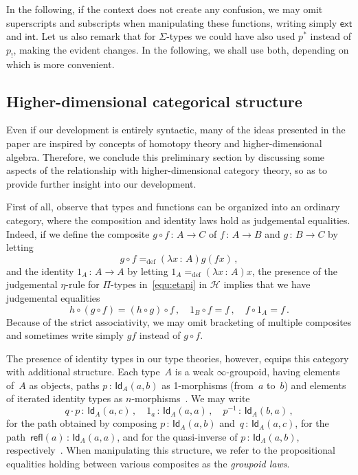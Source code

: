 \documentclass[10pt,a4paper,oneside,reqno]{amsart}
\numberwithin{equation}{section}
\theoremstyle{mythm}
\theoremstyle{mydef}
\theoremstyle{myrmk}
\newcommand{\defeq}{=_{\mathrm{def}}}
\newcommand{\co}{\,{:}\,}
\newcommand{\ct}{\cdot}
\newcommand{\Hint}{\mathcal{H}}
\newcommand{\ext}{\mathsf{ext}}
\renewcommand{\int}{\mathsf{int}}
\newcommand{\Id}{\mathsf{Id}}
\newcommand{\refl}{\mathsf{refl}}
\begin{document}
In the following, if the context does not create any confusion, we may omit  superscripts and subscripts when manipulating these functions, writing simply $\ext$ and $\int$. Let us also remark that for $\Sigma$-types we could have also used $p^*$ instead
of $p_{!}$, making the evident changes. In the following, we shall use both, depending on which is more convenient.

\subsection*{Higher-dimensional categorical structure} Even if our development is entirely syntactic,
many of the ideas presented in the paper are inspired by concepts of homotopy theory and higher-dimensional
algebra. Therefore, we conclude this preliminary section by  discussing some aspects of the relationship with higher-dimensional category theory, so as to provide further insight into our development.

 First of all, observe that types and functions can be organized into an ordinary 
 category, where the composition and identity laws hold as judgemental equalities. Indeed, if we define the composite $g \circ f \co A 
\to C$ of $f \co A \to B$ and $g \co B \to C$ by letting
\[
 g \circ f \defeq (\lambda x \co A) g ( f  x) \, ,
 \]
 and the identity $1_A \co A \to A$ by letting $1_A \defeq (\lambda x \co A) x$, 
 the presence of the judgemental $\eta$-rule for $\Pi$-types in~\eqref{equ:etapi} in $\Hint$ implies that
 we have judgemental equalities
 \begin{equation}
 \label{equ:assoc}
  h \circ (g \circ f) = (h \circ g) \circ f \, , \quad 1_B \circ f =  f \, , \quad  f \circ 1_A = f \, .
  \end{equation}
  Because of the strict associativity, we may omit bracketing of multiple composites and sometimes write simply $gf$ instead of $g \circ f$. 

The presence of identity types in our type theories, however, equips this category with additional structure. Each  
type~$A$ is a weak $\infty$-groupoid, having  elements of~$A$ as objects, paths
$p \co \Id_A(a,b)$ as 1-morphisms (from~$a$ to~$b$) and elements of iterated identity types as 
$n$-morphisms~\cite{LumsdaineP:weaci,vandenBergB:typwg}. 
We may write 
\[
q \ct p \co \Id_A(a,c) \, , \quad
1_a \co \Id_A(a,a) \, , \quad 
p^{-1} \co \Id_A(b,a) \, ,
\]
for the path obtained by composing $p \co \Id_A(a,b)$ and~$q \co \Id_A(a,c)$,  for the path~$\refl(a) \co \Id_A(a,a)$, and for the quasi-inverse of $p \co \Id_A(a,b)$, respectively~\cite{HofmannM:gromtt}. 
When manipulating this structure, we  refer to the  propositional equalities holding between 
various composites as the \emph{groupoid laws}.
\end{document}
